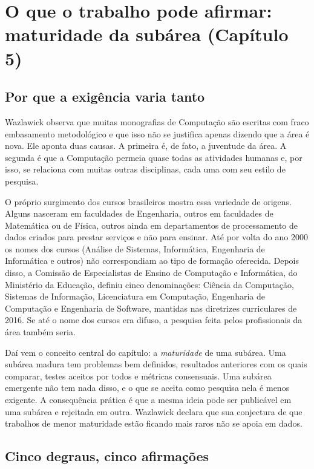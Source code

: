 \documentclass[10pt,a4paper]{extarticle}
\theoremstyle{definition}
\begin{document}
\section{O que o trabalho pode afirmar: maturidade da subárea (Capítulo 5)}\label{sec:maturidade}

\subsection{Por que a exigência varia tanto}

Wazlawick observa que muitas monografias de Computação são escritas com fraco embasamento metodológico e que isso não se justifica apenas dizendo que a área é nova. Ele aponta duas causas. A primeira é, de fato, a juventude da área. A segunda é que a Computação permeia quase todas as atividades humanas e, por isso, se relaciona com muitas outras disciplinas, cada uma com seu estilo de pesquisa.

O próprio surgimento dos cursos brasileiros mostra essa variedade de origens. Alguns nasceram em faculdades de Engenharia, outros em faculdades de Matemática ou de Física, outros ainda em departamentos de processamento de dados criados para prestar serviços e não para ensinar. Até por volta do ano 2000 os nomes dos cursos (Análise de Sistemas, Informática, Engenharia de Informática e outros) não correspondiam ao tipo de formação oferecida. Depois disso, a Comissão de Especialistas de Ensino de Computação e Informática, do Ministério da Educação, definiu cinco denominações: Ciência da Computação, Sistemas de Informação, Licenciatura em Computação, Engenharia de Computação e Engenharia de Software, mantidas nas diretrizes curriculares de 2016. Se até o nome dos cursos era difuso, a pesquisa feita pelos profissionais da área também seria.

Daí vem o conceito central do capítulo: a \emph{maturidade} de uma subárea. Uma subárea madura tem problemas bem definidos, resultados anteriores com os quais comparar, testes aceitos por todos e métricas consensuais. Uma subárea emergente não tem nada disso, e o que se aceita como pesquisa nela é menos exigente. A consequência prática é que a mesma ideia pode ser publicável em uma subárea e rejeitada em outra. Wazlawick declara que sua conjectura de que trabalhos de menor maturidade estão ficando mais raros não se apoia em dados.

\subsection{Cinco degraus, cinco afirmações}
\end{document}

